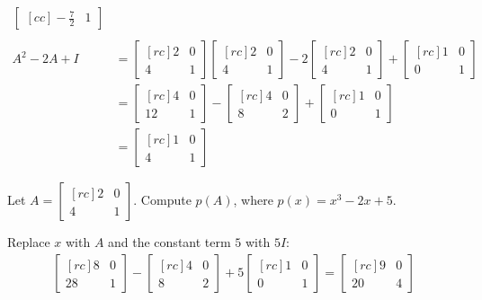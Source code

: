 \begin{solution}
\begin{align*}
\begin{bmatrix}[cc]
-\frac{7}{2}&1
\end{bmatrix} 
\\ \\
A^2 -2A + I&=\begin{bmatrix}[rc]
2&0\\
4&1
\end{bmatrix} \begin{bmatrix}[rc]
2&0\\
4&1
\end{bmatrix} -2\begin{bmatrix}[rc]
2&0\\
4&1
\end{bmatrix} +
\begin{bmatrix}[rc]
1&0\\
0&1
\end{bmatrix}
\\
&=
\begin{bmatrix}[rc]
4&0\\
12&1
\end{bmatrix}
-
\begin{bmatrix}[rc]
4&0\\
8&2
\end{bmatrix} 
+
\begin{bmatrix}[rc]
1&0\\
0&1
\end{bmatrix} \\
&=
\begin{bmatrix}[rc]
1&0\\
4&1
\end{bmatrix} 
\end{align*}
\end{solution}
\ii Let $A=\begin{bmatrix}[rc]
2&0\\
4&1
\end{bmatrix}$. Compute $p(A)$, where $p(x)=x^3-2x+5$.
\\ 
\begin{solution}
Replace $x$ with $A$ and the constant term $5$ with $5I$: 
\begin{eqnarray*}
\begin{bmatrix}[rc]
8&0\\
28&1
\end{bmatrix} 
-
\begin{bmatrix}[rc]
4&0\\
8&2
\end{bmatrix} 
+
5\begin{bmatrix}[rc]
1&0\\
0&1
\end{bmatrix} 
=
\begin{bmatrix}[rc]
9&0\\
20&4
\end{bmatrix} \end{eqnarray*}
\end{solution}
